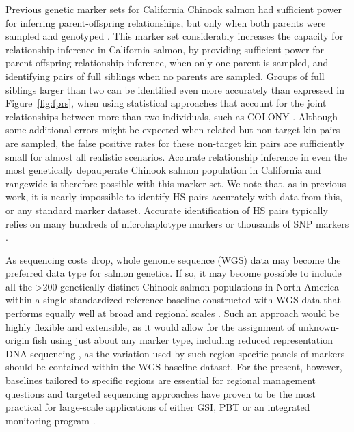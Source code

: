 Previous genetic marker sets for California Chinook salmon had sufficient power for inferring
parent-offspring relationships, but only when both parents were sampled and genotyped \citep{clemento2013creation}.
This marker set considerably increases the capacity for relationship inference in California
salmon, by providing sufficient power for parent-offspring relationship inference, when only
one parent is sampled, and identifying pairs of full siblings when no parents are sampled.
Groups of full siblings larger than two can be identified even more accurately than expressed in Figure~\ref{fig:fprs},
when using statistical approaches that account for the joint relationships between more than two individuals,
such as COLONY \citep{wang2004sibship}.
Although some additional errors might be
expected when related but non-target kin pairs are sampled,  the false positive rates
for these non-target kin pairs are sufficiently small
for almost all realistic scenarios.
Accurate relationship
inference in even the most genetically depauperate Chinook salmon population in California
and rangewide \citep{seeb2007development,clemento2014evaluation} is therefore possible with this marker set.
We note that, as in previous work, it is nearly impossible to identify HS pairs accurately
with data from this, or any standard marker dataset. Accurate identification of HS pairs
typically relies on many hundreds of microhaplotype markers \citep{baetscher2018microhaplotypes} or thousands of SNP markers \citep{hillary2018genetic}. 

As sequencing costs drop, whole genome sequence (WGS) data may become the preferred
data type for salmon genetics. If so, it may become possible to include
all the >200 genetically distinct Chinook salmon populations in North America within a
single standardized reference baseline constructed with WGS data
that performs equally well at broad and regional scales \citep{desaixINPRESSpopulation}.
Such an approach would be highly flexible and extensible, as it would allow for the 
assignment of unknown-origin fish using
just about any marker type, including reduced representation DNA sequencing
\citep[e.g.,~RADseq,][]{meek2020identifying,thompson2024genomics},
as the variation used by such region-specific panels of markers should be contained within the WGS baseline dataset.
For the present, however,
baselines tailored to specific regions are essential for regional management questions and
targeted sequencing approaches have proven to be the most practical for large-scale
applications of either GSI, PBT or an integrated monitoring program \citep{beacham2021parentage}.



